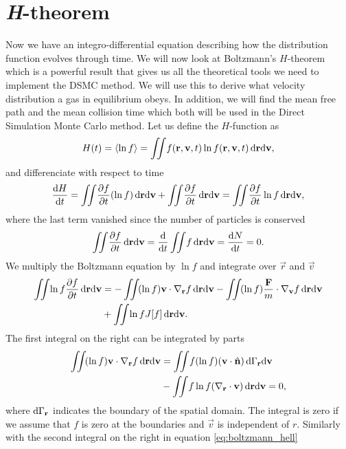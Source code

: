 \section{\textit{H}-theorem}
Now we have an integro-differential equation describing how the distribution function evolves through time. We will now look at Boltzmann's $H$-theorem which is a powerful result that gives us all the theoretical tools we need to implement the DSMC method. We will use this to derive what velocity distribution a gas in equilibrium obeys. In addition, we will find the mean free path and the mean collision time which both will be used in the Direct Simulation Monte Carlo method. Let us define the $H$-function as
\begin{align}
	\label{eq:h_function}
	H(t) = \langle \ln f \rangle = \iint\! f(\mathbf r, \mathbf v, t)\ln f(\mathbf r, \mathbf v, t)\,\mathrm{d}\mathbf r \mathrm{d}\mathbf v,
\end{align}
and differenciate with respect to time
\begin{align}
	\label{eq:h_theorem_one}
	\frac{\mathrm{d}H}{\mathrm{d}t} = \iint\! \frac{\partial f}{\partial t}(\ln f) \,\mathrm{d}\mathbf r \mathrm{d}\mathbf v + \iint\! \frac{\partial f}{\partial t} \,\mathrm{d}\mathbf r \mathrm{d}\mathbf v = \iint\! \frac{\partial f}{\partial t}\ln f \,\mathrm{d}\mathbf r \mathrm{d}\mathbf v,
\end{align}
where the last term vanished since the number of particles is conserved
\begin{align}
	\iint\! \dpart{f}{t} \,\dm\vec r \dm\vec v = \frac{\dm}{\dm t} \iint\! f \,\dm\vec r \dm\vec v = \frac{\dm N}{\dm t} = 0.
\end{align}
We multiply the Boltzmann equation by $\ln f$ and integrate over $\vec r$ and $\vec v$
\begin{align}
	\nonumber
	\iint\! \ln f\frac{\partial f}{\partial t} \,\mathrm{d}\mathbf r \mathrm{d}\mathbf v &= -\iint\! (\ln f)\mathbf v\cdot \nabla_\mathbf r f \,\mathrm{d}\mathbf r \mathrm{d}\mathbf v - \iint\! (\ln f) \frac{\mathbf F}{m}\cdot \nabla_\mathbf v f \,\mathrm{d}\mathbf r\mathrm{d}\mathbf v\\
	\label{eq:boltzmann_hell}
	&+ \iint\! \ln f J[f] \,\mathrm{d}\mathbf r \mathrm{d}\mathbf v.
\end{align}
The first integral on the right can be integrated by parts
\begin{align}
	\nonumber
	\iint\! (\ln f)\mathbf v\cdot \nabla_\mathbf r f \,\mathrm{d}\mathbf r \mathrm{d}\mathbf v &= \iint\! f(\ln f) (\mathbf v\cdot \hat{\mathbf n}) \,\mathrm{d}\Gamma_\mathbf r\mathrm{d}\mathbf v\\
	&- \iint\! f\ln f(\nabla_\mathbf r \cdot \mathbf v)\,\mathrm{d}\mathbf r\mathrm{d}\mathbf v = 0,
\end{align}
where $\mathrm{d}\Gamma_\mathbf r$ indicates the boundary of the spatial domain. The integral is zero if we assume that $f$ is zero at the boundaries and $\vec v$ is independent of $r$. Similarly with the second integral on the right in equation \eqref{eq:boltzmann_hell}
